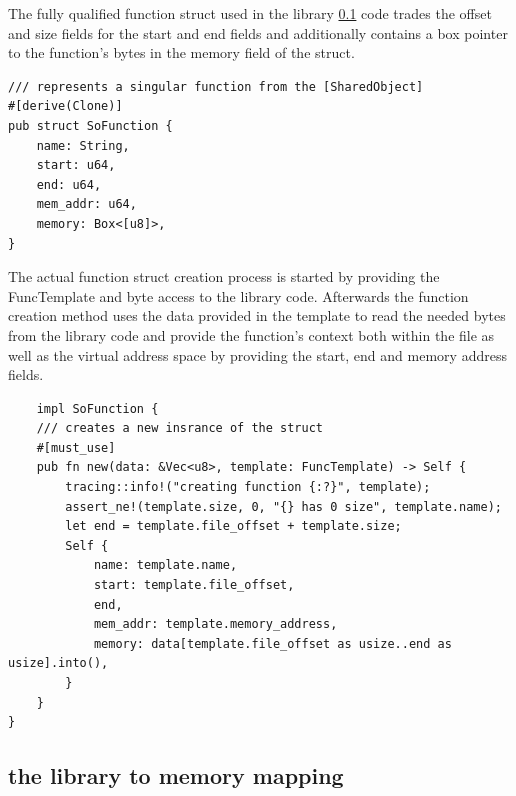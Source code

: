 The fully qualified function struct used in the library \ref{} code trades the offset and size fields for the start and end fields and additionally contains a box pointer to the function's bytes in the memory field of the struct.
\begin{lstlisting}
/// represents a singular function from the [SharedObject]
#[derive(Clone)]
pub struct SoFunction {
    name: String,
    start: u64,
    end: u64,
    mem_addr: u64,
    memory: Box<[u8]>,
}
\end{lstlisting}
The actual function struct creation process is started by providing the FuncTemplate and byte access to the library code. 
Afterwards the function creation method uses the data provided in the template to read the needed bytes from the library code and provide the function's context both within the file as well as the virtual address space by providing the start, end and memory address fields. 
\begin{lstlisting}
    impl SoFunction {
    /// creates a new insrance of the struct
    #[must_use]
    pub fn new(data: &Vec<u8>, template: FuncTemplate) -> Self {
        tracing::info!("creating function {:?}", template);
        assert_ne!(template.size, 0, "{} has 0 size", template.name);
        let end = template.file_offset + template.size;
        Self {
            name: template.name,
            start: template.file_offset,
            end,
            mem_addr: template.memory_address,
            memory: data[template.file_offset as usize..end as usize].into(),
        }
    }
}
\end{lstlisting}

\subsection{the library to memory mapping}

